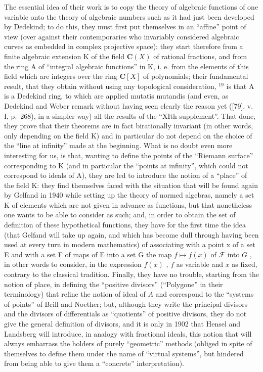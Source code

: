 The essential idea of their work is to copy the theory of algebraic functions of one variable onto the theory of algebraic numbers such as it had just been developed by Dedekind; to do this, they must first put themselves in an ``affine'' point of view (over against their contemporaries who invariably considered algebraic curves as embedded in complex projective space): they start therefore from a finite algebraic extension K of the field \(\mathbf{C}(X)\) of rational fractions, and from the ring A of ``integral algebraic functions'' in K, i. e. from the elements of this field which are integers over the ring \(\mathbf{C}[X]\) of polynomials; their fundamental result, that they obtain without using any topological consideration, \(^{19}\) is that A is a Dedekind ring, to which are applied mutatis mutandis (and even, as Dedekind and Weber remark without having seen clearly the reason yet ({[}79{]}, v. I, p.~268), in a simpler way) all the results of the ``XIth supplement''. That done, they prove that their theorems are in fact birationally invariant (in other words, only depending on the field K) and in particular do not depend on the choice of the ``line at infinity'' made at the beginning. What is no doubt even more interesting for us, is that, wanting to define the points of the ``Riemann surface'' corresponding to K (and in particular the ``points at infinity'', which could not correspond to ideals of A), they are led to introduce the notion of a ``place'' of the field K: they find themselves faced with the situation that will be found again by Gelfand in 1940 while setting up the theory of normed algebras, namely a set K of elements which are not given in advance as functions, but that nonetheless one wants to be able to consider as such; and, in order to obtain the set of definition of these hypothetical functions, they have for the first time the idea (that Gelfand will take up again, and which has become dull through having been used at every turn in modern mathematics) of associating with a point x of a set E and with a set F of maps of E into a set G the map \(f \mapsto f(x)\) of \(\mathcal{F}\) into \(G\) , in other words to consider, in the expression \(f(x)\) , \(f\) as variable and \(x\) as fixed, contrary to the classical tradition. Finally, they have no trouble, starting from the notion of place, in defining the ``positive divisors'' (``Polygone'' in their terminology) that refine the notion of ideal of \(A\) and correspond to the ``systems of points'' of Brill and Noether; but, although they write the principal divisors and the divisors of differentials as ``quotients'' of positive divisors, they do not give the general definition of divisors, and it is only in 1902 that Hensel and Landsberg will introduce, in analogy with fractional ideals, this notion that will always embarrass the holders of purely ``geometric'' methods (obliged in spite of themselves to define them under the name of ``virtual systems'', but hindered from being able to give them a ``concrete'' interpretation).

